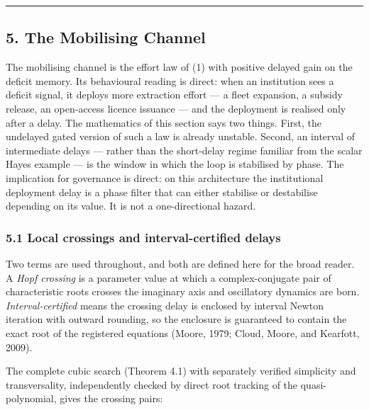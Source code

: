\documentclass[11pt]{article}
\begin{document}
\begin{center}\rule{0.5\linewidth}{0.5pt}\end{center}

\subsection{5. The Mobilising Channel}\label{the-mobilising-channel}

The mobilising channel is the effort law of (1) with positive delayed
gain on the deficit memory. Its behavioural reading is direct: when an
institution sees a deficit signal, it deploys more extraction effort ---
a fleet expansion, a subsidy release, an open-access licence issuance
--- and the deployment is realised only after a delay. The mathematics
of this section says two things. First, the undelayed gated version of
such a law is already unstable. Second, an interval of intermediate
delays --- rather than the short-delay regime familiar from the scalar
Hayes example --- is the window in which the loop is stabilised by
phase. The implication for governance is direct: on this architecture
the institutional deployment delay is a phase filter that can either
stabilise or destabilise depending on its value. It is not a
one-directional hazard.

\subsubsection{5.1 Local crossings and interval-certified
delays}\label{local-crossings-and-interval-certified-delays}

Two terms are used throughout, and both are defined here for the broad
reader. A \emph{Hopf crossing} is a parameter value at which a
complex-conjugate pair of characteristic roots crosses the imaginary
axis and oscillatory dynamics are born. \emph{Interval-certified} means
the crossing delay is enclosed by interval Newton iteration with outward
rounding, so the enclosure is guaranteed to contain the exact root of
the registered equations (Moore, 1979; Cloud, Moore, and Kearfott,
2009).

The complete cubic search (Theorem 4.1) with separately verified
simplicity and transversality, independently checked by direct root
tracking of the quasi-polynomial, gives the crossing pairs:
\end{document}
